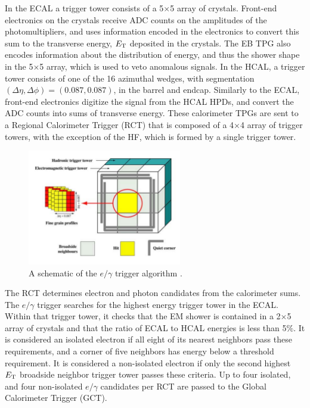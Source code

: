 \par In the ECAL a trigger tower consists of a 5$\times$5 array
of crystals.  Front-end electronics on the crystals receive ADC counts
on the amplitudes of the photomultipliers, and uses information
encoded in the electronics to convert this sum to the transverse
energy, $E_{\mathrm{T}}$ deposited in the crystals.  The EB TPG also encodes
information about the distribution of energy, and thus the shower
shape in the 5$\times$5 array, which is used to veto anomalous
signals.  In the HCAL, a trigger tower consists of one of the 16
azimuthal wedges, with segmentation $(\Delta\eta, \Delta\phi) =
(0.087, 0.087)$, in the barrel and endcap.  Similarly to the ECAL,
front-end electronics digitize the signal from the HCAL HPDs, and
convert the ADC counts into sums of transverse energy.  These
calorimeter TPGs are sent to a Regional Calorimeter Trigger (RCT) that
is composed of a 4$\times$4 array of trigger towers, with the
exception of the HF, which is formed by a single trigger tower.

\begin{figure}[h]
   \centering
  \includegraphics[width=0.6\textwidth]{Figures/CMS_Diagrams/Trigger__RCT_schematic.pdf}
  \caption{A schematic of the $e/\gamma$ trigger algorithm
    \cite{CMS:CMS_Machine_Chatrchyan:2008aa}. } \label{fig:tigger_rct_algo}
\end{figure}

\par The RCT determines electron and photon candidates from the
calorimeter sums.  The $e/\gamma$ trigger searches for the highest
energy trigger tower in the ECAL.  Within that trigger tower, it
checks that the EM shower is contained in a 2$\times$5 array of crystals
and that the ratio of ECAL to HCAL energies is less than 5$\%$.  It is
considered an isolated electron if all eight of its nearest neighbors 
pass these requirements, and a corner of five neighbors has energy
below a threshold requirement.  It is considered a non-isolated
electron if only the second highest $E_{\mathrm{T}}$ broadside neighbor trigger
tower passes these criteria.  Up to four isolated, and four
non-isolated $e/\gamma$ candidates per RCT are passed to the Global
Calorimeter Trigger (GCT).  

